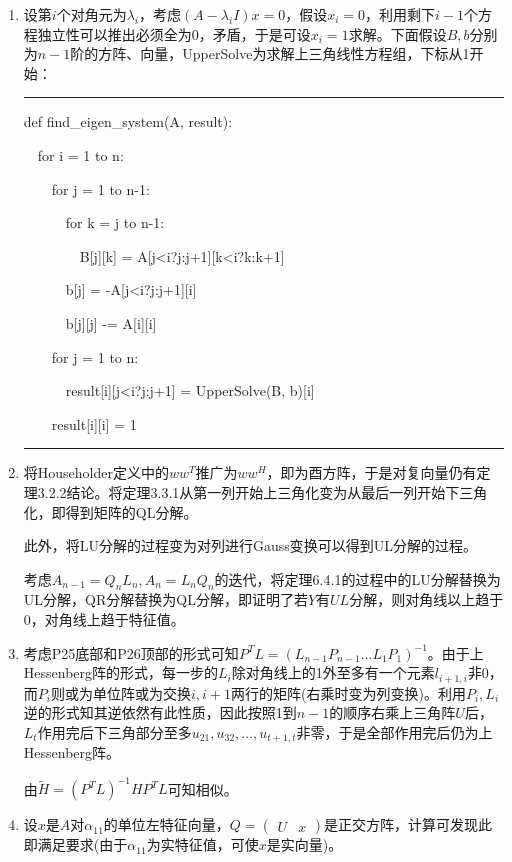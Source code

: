 \documentclass[a4paper,UTF8,fontset=windows]{ctexart}
\newenvironment{code}{\rule{36em}{0.1em}\setlength{\parindent}{1em}\setmainfont{Consolas}

}{

\setlength{\parindent}{0em}\rule{36em}{0.1em}}
\begin{document}
\begin{enumerate}
\item
设第$i$个对角元为$\lambda_i$，考虑$(A-\lambda_i I)x=0$，假设$x_i=0$，利用剩下$i-1$个方程独立性可以推出必须全为0，矛盾，于是可设$x_i=1$求解。下面假设$B,b$分别为$n-1$阶的方阵、向量，UpperSolve为求解上三角线性方程组，下标从1开始：

\begin{code}
def find\_eigen\_system(A, result):

\ \ for i = 1 to n:

\ \ \ \ for j = 1 to n-1:

\ \ \ \ \ \ for k = j to n-1:

\ \ \ \ \ \ \ \ B[j][k] = A[j<i?j:j+1][k<i?k:k+1]

\ \ \ \ \ \ b[j] = -A[j<i?j:j+1][i]

\ \ \ \ \ \ b[j][j] -= A[i][i]

\ \ \ \ for j = 1 to n:

\ \ \ \ \ \ result[i][j<i?j:j+1] = UpperSolve(B, b)[i]

\ \ \ \ result[i][i] = 1
\end{code}

\item
将Householder定义中的$ww^T$推广为$ww^H$，即为酉方阵，于是对复向量仍有定理3.2.2结论。将定理3.3.1从第一列开始上三角化变为从最后一列开始下三角化，即得到矩阵的QL分解。

此外，将LU分解的过程变为对列进行Gauss变换可以得到UL分解的过程。

考虑$A_{n-1}=Q_nL_n,A_n=L_nQ_n$的迭代，将定理6.4.1的过程中的LU分解替换为UL分解，QR分解替换为QL分解，即证明了若$Y$有$UL$分解，则对角线以上趋于0，对角线上趋于特征值。

\item
考虑P25底部和P26顶部的形式可知$P^TL=(L_{n-1}P_{n-1}\dots L_1P_1)^{-1}$。由于上Hessenberg阵的形式，每一步的$L_i$除对角线上的1外至多有一个元素$l_{i+1,i}$非0，而$P_i$则或为单位阵或为交换$i,i+1$两行的矩阵(右乘时变为列变换)。利用$P_i,L_i$逆的形式知其逆依然有此性质，因此按照1到$n-1$的顺序右乘上三角阵$U$后，$L_t$作用完后下三角部分至多$u_{21},u_{32},\dots,u_{t+1,t}$非零，于是全部作用完后仍为上Hessenberg阵。

由$\tilde{H}=(P^TL)^{-1}HP^TL$可知相似。

\item
设$x$是$A$对$\alpha_{11}$的单位左特征向量，$Q=\begin{pmatrix}U&x\end{pmatrix}$是正交方阵，计算可发现此即满足要求(由于$\alpha_{11}$为实特征值，可使$x$是实向量)。


\end{enumerate}
\end{document}
